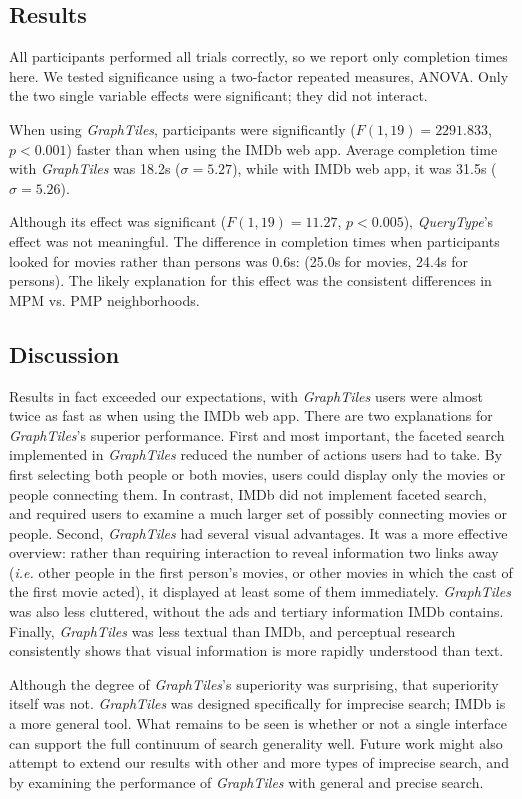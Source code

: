 \subsection{Results}

All participants performed all trials correctly, so we report only completion times here. We tested significance using a two-factor repeated measures, ANOVA. Only the two single variable effects were significant; they did not interact. 

When using \textit{GraphTiles}, participants were significantly ($F(1,19)=2291.833$, $p<0.001$) faster than when using the IMDb web app. Average completion time with \textit{GraphTiles} was 18.2s ($\sigma =5.27$), while with IMDb web app, it was 31.5s ($\sigma = 5.26$).

Although its effect was significant ($F(1,19)=11.27$, $p<0.005$), \textit{QueryType}'s effect was not meaningful. The difference in completion times when participants looked for movies rather than persons was 0.6s: (25.0s for movies, 24.4s for persons). The likely explanation for this effect was the consistent differences in MPM vs. PMP neighborhoods.\\



\subsection{Discussion}

Results in fact exceeded our expectations, with \textit{GraphTiles} users were almost twice as fast as when using the IMDb web app. There are two explanations for \textit{GraphTiles}'s superior performance. First and most important, the faceted search implemented in \textit{GraphTiles} reduced the number of actions users had to take. By first selecting both people or both movies, users could display only the movies or people connecting them. In contrast, IMDb did not implement faceted search, and required users to examine a much larger set of possibly connecting movies or people. Second, \textit{GraphTiles} had several visual advantages. It was a more effective overview: rather than requiring interaction to reveal information two links away (\textit{i.e.} other people in the first person's movies, or other movies in which the cast of the first movie acted), it displayed at least some of them immediately. \textit{GraphTiles} was also less cluttered, without the ads and tertiary information IMDb contains. Finally, \textit{GraphTiles} was less textual than IMDb, and perceptual research consistently shows that visual information is more rapidly understood than text.

Although the degree of \textit{GraphTiles}'s superiority was surprising, that superiority itself was not. \textit{GraphTiles} was designed specifically for imprecise search; IMDb is a more general tool. What remains to be seen is whether or not a single interface can support the full continuum of search generality well. Future work might also attempt to extend our results with other and more types of imprecise search, and by examining the performance of \textit{GraphTiles} with general and precise search.
